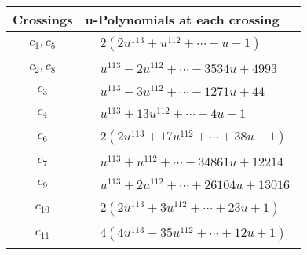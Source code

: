 \documentclass[1p]{elsarticle_modified}
\theoremstyle{definition}
\begin{document}
\begin{tabular}{m{50pt}|m{274pt}}
Crossings & \hspace{64pt}u-Polynomials at each crossing \\
\hline $$\begin{aligned}c_{1},c_{5}\end{aligned}$$&$\begin{aligned}
&2(2 u^{113}+u^{112}+\cdots- u-1)
\end{aligned}$\\
\hline $$\begin{aligned}c_{2},c_{8}\end{aligned}$$&$\begin{aligned}
&u^{113}-2 u^{112}+\cdots-3534 u+4993
\end{aligned}$\\
\hline $$\begin{aligned}c_{3}\end{aligned}$$&$\begin{aligned}
&u^{113}-3 u^{112}+\cdots-1271 u+44
\end{aligned}$\\
\hline $$\begin{aligned}c_{4}\end{aligned}$$&$\begin{aligned}
&u^{113}+13 u^{112}+\cdots-4 u-1
\end{aligned}$\\
\hline $$\begin{aligned}c_{6}\end{aligned}$$&$\begin{aligned}
&2(2 u^{113}+17 u^{112}+\cdots+38 u-1)
\end{aligned}$\\
\hline $$\begin{aligned}c_{7}\end{aligned}$$&$\begin{aligned}
&u^{113}+u^{112}+\cdots-34861 u+12214
\end{aligned}$\\
\hline $$\begin{aligned}c_{9}\end{aligned}$$&$\begin{aligned}
&u^{113}+2 u^{112}+\cdots+26104 u+13016
\end{aligned}$\\
\hline $$\begin{aligned}c_{10}\end{aligned}$$&$\begin{aligned}
&2(2 u^{113}+3 u^{112}+\cdots+23 u+1)
\end{aligned}$\\
\hline $$\begin{aligned}c_{11}\end{aligned}$$&$\begin{aligned}
&4(4 u^{113}-35 u^{112}+\cdots+12 u+1)
\end{aligned}$\\
\hline
\end{tabular}\\~\\
\end{document}
